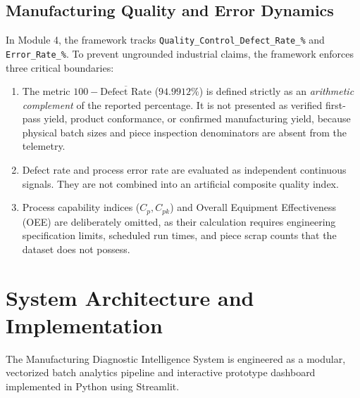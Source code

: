 \documentclass[journal]{IEEEtran}
\begin{document}
\subsection{Manufacturing Quality and Error Dynamics}
In Module 4, the framework tracks \texttt{Quality\_Control\_Defect\_Rate\_\%} and \texttt{Error\_Rate\_\%}. To prevent ungrounded industrial claims, the framework enforces three critical boundaries:
\begin{enumerate}
    \item The metric $100 - \overline{\text{Defect Rate}}$ ($94.9912\%$) is defined strictly as an \textit{arithmetic complement} of the reported percentage. It is not presented as verified first-pass yield, product conformance, or confirmed manufacturing yield, because physical batch sizes and piece inspection denominators are absent from the telemetry.
    \item Defect rate and process error rate are evaluated as independent continuous signals. They are not combined into an artificial composite quality index.
    \item Process capability indices ($C_p, C_{pk}$) and Overall Equipment Effectiveness (OEE) are deliberately omitted, as their calculation requires engineering specification limits, scheduled run times, and piece scrap counts that the dataset does not possess.
\end{enumerate}

\section{System Architecture and Implementation}
\label{sec:architecture}

The Manufacturing Diagnostic Intelligence System is engineered as a modular, vectorized batch analytics pipeline and interactive prototype dashboard implemented in Python using Streamlit.
\end{document}
